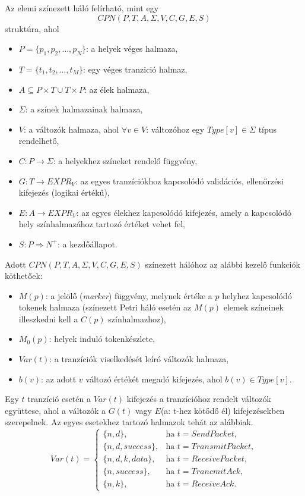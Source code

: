 Az elemi színezett háló felírható, mint egy
\[
CPN(P, T, A, \Sigma, V, C, G, E, S)
\]
struktúra, ahol 
\begin{itemize}
\item $P=\{ p_1, p_2, \ldots, p_N \}$: a helyek véges halmaza,
\item $T=\{ t_1, t_2, \ldots, t_M\}$: egy véges tranzició halmaz,
\item $A \subseteq P\times T \cup T \times P$: az élek halmaza,
\item $\Sigma$: a színek halmazainak halmaza, 
\item $V$: a változók halmaza, ahol $\forall v\in V$: változóhoz egy $Type[v] \in \Sigma $ típus rendelhető,
\item $C: P\rightarrow \Sigma$: a helyekhez színeket rendelő függvény,
\item $G: T\rightarrow EXPR_V$: az egyes tranzíciókhoz kapcsolódó validációs, ellenőrzési kifejezés (logikai értékű),
\item $E: A\rightarrow EXPR_V$: az egyes élekhez kapcsolódó kifejezés, amely a kapcsolódó hely színhalmazához tartozó értéket vehet fel,
\item $S: P\Rightarrow N^+$: a kezdőállapot.
\end{itemize}

Adott $CPN(P, T, A, \Sigma, V, C, G, E, S)$ színezett hálóhoz az alábbi kezelő funkciók köthetőek: 
\begin{itemize}
\item $M(p)$: a jelölő (\textit{marker}) függvény, melynek értéke a $p$ helyhez kapcsolódó tokenek halmaza (színezett Petri háló esetén az $M(p)$ elemek színeinek illeszkedni kell a $C(p)$ színhalmazhoz),
\item $M_0(p)$: helyek induló tokenkészlete,
\item $Var(t)$: a tranzíciók viselkedését leíró változók halmaza,
\item $b(v)$: az adott $v$ változó értékét megadó kifejezés, ahol $b(v) \in Type[v]$.
\end{itemize}

Egy $t$ tranzíció esetén a $Var(t)$ kifejezés a tranzícióhoz rendelt változók együttese, ahol a változók a $G(t)$ vagy $E$(a: t-hez kötődő él) kifejezésekben szerepelnek.
Az egyes esetekhez tartozó halmazok tehát az alábbiak.
\begin{equation*}
Var(t)=\begin{cases}
\{n,d\}, &\text{ha } t=SendPacket, \\
\{n,d,success\}, &\text{ha } t= TransmitPacket, \\
\{n,d,k,data\}, &\text{ha } t=ReceivePacket, \\
\{n,success\}, &\text{ha } t=TrancmitAck, \\
\{n,k\}, &\text{ha }t=ReceiveAck.
\end{cases}
\end{equation*}

